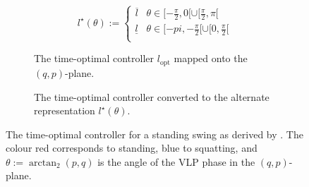 \begin{equation}\label{eqn:vlp-optimal-controller}
   l^\star(\theta):= \begin{cases}
      \overline{l} & \theta \in [-\frac{\pi}{2},0[ \cup [\frac{\pi}{2}, \pi[ \\
      \underline{l} & \theta \in [-pi, -\frac{\pi}{2}[ \cup [0,\frac{\pi}{2}[ \\
   \end{cases}
\end{equation}

\begin{figure}
   \centering
   \begin{subfigure}[t]{0.45\textwidth}
      
      \caption{The time-optimal controller \(l_\text{opt}\) mapped onto the \((q,p)\)-plane.}
      \label{fig:vlp-optimal-controller-qp-plane}
   \end{subfigure}
   \hfill
   \begin{subfigure}[t]{0.45\textwidth}
      
      \caption{The time-optimal controller converted to the alternate
         representation \(l^\star(\theta)\).}
      \label{fig:vlp-optimal-controller}
   \end{subfigure}
   \caption{The time-optimal controller for a standing swing as derived by
      \cite{pumping_swing_standing_squatting}. The colour red
      corresponds to standing, blue to squatting, and 
      \(\theta := \arctan_2(p,q)\) is the angle of the VLP phase in the
      \((q,p)\)-plane.}
\end{figure}

